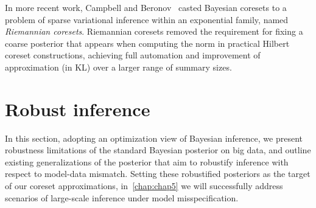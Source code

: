 In more recent work, Campbell and Beronov~\citep{campbell19neurips} casted Bayesian coresets to a problem of sparse variational inference within an exponential family, named \emph{Riemannian coresets}. Riemannian coresets removed the requirement for fixing a coarse posterior that appears when computing the norm in practical Hilbert coreset constructions, achieving full automation and improvement of approximation (in KL) over a larger range of summary sizes.


\section{Robust inference}
\label{sec:brobust-inference}

In this section, adopting an optimization view of Bayesian inference, we present robustness limitations of the standard Bayesian posterior on big data, and outline existing generalizations of the posterior that aim to robustify inference with respect to model-data mismatch. Setting these robustified posteriors as the target of our coreset approximations, in~\cref{chap:chap5} we will successfully address scenarios of large-scale inference under model misspecification.

